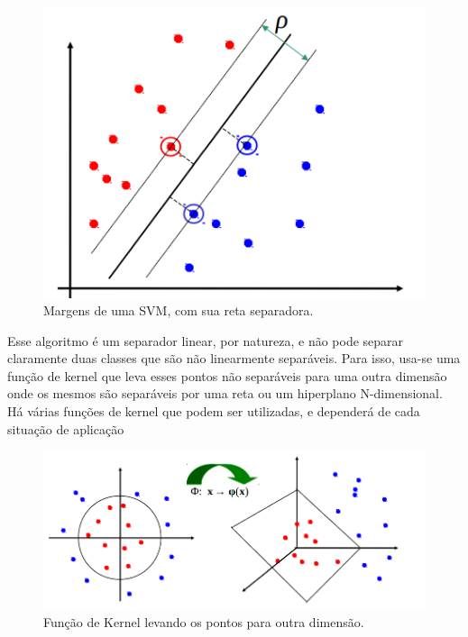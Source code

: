 \documentclass{article} %
\begin{document}
\begin{figure}[h] %
    \centering %
    \includegraphics[width=0.5\linewidth]{SVM_pic.png} %
    \caption{Margens de uma SVM, com sua reta separadora.} %
    \label{fig:exemplo} %
\end{figure}

\vspace{1cm}

Esse algoritmo é um separador linear, por natureza, e não pode separar claramente duas classes que são não linearmente separáveis. Para isso, usa-se uma função de kernel que leva esses pontos não separáveis para uma outra dimensão onde os mesmos são separáveis por uma reta ou um hiperplano N-dimensional. Há várias funções de kernel que podem ser utilizadas, e dependerá de cada situação de aplicação

\vspace{1cm}

\begin{figure}[h] %
    \centering %
    \includegraphics[width=0.75\linewidth]{Kernel_SVM.png} %
    \caption{Função de Kernel levando os pontos para outra dimensão.} %
    \label{fig:exemplo} %
\end{figure}
\end{document}
